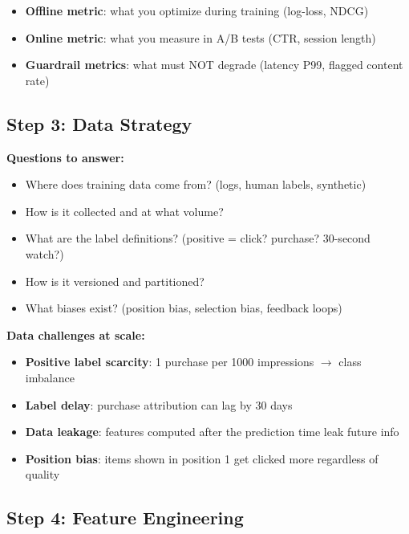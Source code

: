 \documentclass[11pt]{article}
\providecommand{\tightlist}{\setlength{\itemsep}{1pt}\setlength{\parskip}{0pt}}
\begin{document}
\begin{itemize}
\tightlist
\item
  \textbf{Offline metric}: what you optimize during training (log-loss, NDCG)
\item
  \textbf{Online metric}: what you measure in A/B tests (CTR, session length)
\item
  \textbf{Guardrail metrics}: what must NOT degrade (latency P99, flagged content rate)
\end{itemize}

\subsection{Step 3: Data Strategy}\label{step-3-data-strategy}

\textbf{Questions to answer:}

\begin{itemize}
\tightlist
\item
  Where does training data come from? (logs, human labels, synthetic)
\item
  How is it collected and at what volume?
\item
  What are the label definitions? (positive = click? purchase? 30-second watch?)
\item
  How is it versioned and partitioned?
\item
  What biases exist? (position bias, selection bias, feedback loops)
\end{itemize}

\textbf{Data challenges at scale:}

\begin{itemize}
\tightlist
\item
  \textbf{Positive label scarcity}: 1 purchase per 1000 impressions \(\rightarrow\) class imbalance
\item
  \textbf{Label delay}: purchase attribution can lag by 30 days
\item
  \textbf{Data leakage}: features computed after the prediction time leak future info
\item
  \textbf{Position bias}: items shown in position 1 get clicked more regardless of quality
\end{itemize}

\subsection{Step 4: Feature Engineering}\label{step-4-feature-engineering}
\end{document}
